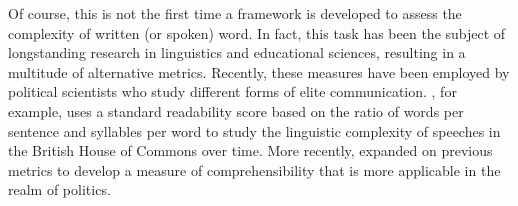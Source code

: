 Of course, this is not the first time a framework is developed to assess the complexity of written (or spoken) word. In fact, this task has been the subject of longstanding research in linguistics and educational sciences, resulting in a multitude of alternative metrics. Recently, these measures have been employed by political scientists who study different forms of elite communication. \citet{spirling2016democratization}, for example, uses a standard readability score based on the ratio of words per sentence and syllables per word to study the linguistic complexity of speeches in the British House of Commons over time. More recently, \citet{benoit2019measuring} expanded on previous metrics to develop a measure of comprehensibility that is more applicable in the realm of politics.

